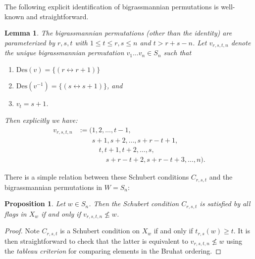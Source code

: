 \documentclass[12pt,dvips]{amsart}
\theoremstyle{plain}
\newtheorem{proposition}[theorem]{Proposition}
\newtheorem{lemma}[theorem]{Lemma}
\theoremstyle{definition}
\theoremstyle{remark}
\numberwithin{equation}{section}
\def\Des{\mathrm{Des}}
\newcommand{\comment}[1]{$\star$
{\sf\textbf{#1}}$\star$}
\begin{document}
The following 
explicit identification of bigrassmannian permutations 
is well-known and straightforward. 

\begin{lemma}
The bigrassmannian permutations (other than the identity) are
parameterized by $r,s,t$ with $1\leq t \leq r,s \leq n$ and $t>r+s-n$.
Let $v_{r,s,t,n}$ denote the unique bigrassmannian permutation
$v_1\ldots v_n\in S_n$ such that
\begin{enumerate}
\item[$\bullet$] $\Des(v)=\{(r\leftrightarrow r+1)\}$ 
\item[$\bullet$] $\Des(v^{-1})=\{(s\leftrightarrow s+1)\}$, and
\item[$\bullet$] $v_t=s+1$.
\end{enumerate}
Then explicitly we have:
\begin{equation}
\label{v-explicitly}
\begin{aligned}
v_{r,s,t,n}&:=(1, 2, \ldots,t-1 , \\
        & \qquad s+1, s+2, \ldots, s+r-t+1, \\
        & \quad \qquad t, t+1,t+2, \ldots,s,\\
        & \qquad \qquad s+r-t+2,s+r-t+3,\ldots,n).
\end{aligned}
\end{equation}
\end{lemma}


There is a simple relation between these Schubert conditions $C_{r,s,t}$
and the bigrassmannian permutations in $W=S_n$:

\begin{proposition}
\label{bigrassmannian-as-Schubert-condition}
Let $w\in S_n$.
Then the Schubert condition $C_{r,s,t}$ is satisfied by all flags in $X_w$
if and only if $v_{r,s,t,n} \not\leq w$.
\end{proposition}
\begin{proof}
Note $C_{r,s,t}$ is a Schubert condition on $X_w$ if and only
if $t_{r,s}(w) \geq t$.  It is then straightforward to check that the latter is
equivalent to $v_{r,s,t,n} \not\leq w$ using the {\it tableau criterion}
\cite[Theorem 2.6.3]{BjornerBrenti} for comparing elements in the Bruhat ordering.
\end{proof}
\end{document}
